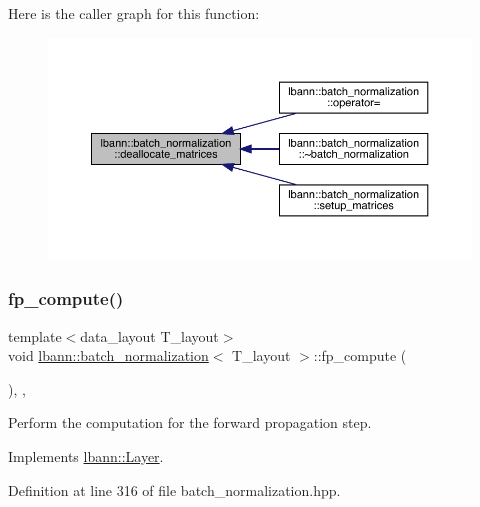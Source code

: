 Here is the caller graph for this function\+:\nopagebreak
\begin{figure}[H]
\begin{center}
\leavevmode
\includegraphics[width=350pt]{classlbann_1_1batch__normalization_ac98f8fbb6e5ea998a06cef2c2cac9f03_icgraph}
\end{center}
\end{figure}
\mbox{\label{classlbann_1_1batch__normalization_a92ad52396d7083c84ec20016ad5e994b}} 
\subsubsection{\texorpdfstring{fp\+\_\+compute()}{fp\_compute()}}
{\footnotesize\ttfamily template$<$data\+\_\+layout T\+\_\+layout$>$ \\
void \hyperlink{classlbann_1_1batch__normalization}{lbann\+::batch\+\_\+normalization}$<$ T\+\_\+layout $>$\+::fp\+\_\+compute (\begin{DoxyParamCaption}{ }\end{DoxyParamCaption})\hspace{0.3cm}{\ttfamily [inline]}, {\ttfamily [override]}, {\ttfamily [virtual]}}

Perform the computation for the forward propagation step. 

Implements \hyperlink{classlbann_1_1Layer_a523319dd1bd87a0612afa1912bb5aad7}{lbann\+::\+Layer}.



Definition at line 316 of file batch\+\_\+normalization.\+hpp.


